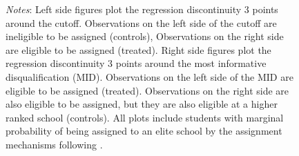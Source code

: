 \documentclass[oneside,11pt]{article}
\begin{document}
\begin{figure}[H]
\footnotesize
\textit{Notes}: Left side figures plot the regression discontinuity 3 points around the cutoff. Observations on the left side of the cutoff are ineligible to be assigned (controls), Observations on the right side are eligible to be assigned (treated). Right side figures plot the regression discontinuity 3 points around the most informative disqualification (MID). Observations on the left side of the MID are eligible to be assigned (treated). Observations on the right side are also eligible to be assigned, but they are also eligible at a higher ranked school (controls). All plots include students with marginal probability of being assigned to an elite school by the assignment mechanisms following \citet{abdulkadirouglu2022breaking}. 
\end{figure}


\clearpage

\end{document}
